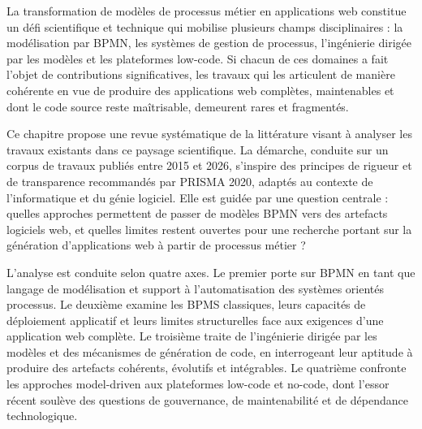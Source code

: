 ﻿
\label{chap:revue-litterature}
\nocite{prisma2020,schaffer2021,sajji2022,sajji2023,pietruck2020,greifenberg2015,rahad2021,dragas2024,delgado2022,avila2021,lopes2023,bucaioni2022,diruscio2022,rokis2023,ajimati2025,castillo2024,sajji2025,krouwel2024,martinez2026,drave2022,fedeli2024,soliman2025,horner2026,kourani2025,kourani2024,licardo2026,neto2022,uyanik2023,hoyos2017,hemel2008,syriani2018,siahaan2024,laaz2020,salado2024,campagna2025,pankowska2024,diaz2018}



La transformation de modèles de processus métier en applications web constitue un défi scientifique et technique qui mobilise plusieurs champs disciplinaires : la modélisation par BPMN, les systèmes de gestion de processus, l'ingénierie dirigée par les modèles et les plateformes low-code. Si chacun de ces domaines a fait l'objet de contributions significatives, les travaux qui les articulent de manière cohérente en vue de produire des applications web complètes, maintenables et dont le code source reste maîtrisable, demeurent rares et fragmentés.

Ce chapitre propose une revue systématique de la littérature visant à analyser les travaux existants dans ce paysage scientifique. La démarche, conduite sur un corpus de travaux publiés entre 2015 et 2026, s'inspire des principes de rigueur et de transparence recommandés par PRISMA 2020, adaptés au contexte de l'informatique et du génie logiciel. Elle est guidée par une question centrale : quelles approches permettent de passer de modèles BPMN vers des artefacts logiciels web, et quelles limites restent ouvertes pour une recherche portant sur la génération d'applications web à partir de processus métier ?

L'analyse est conduite selon quatre axes. Le premier porte sur BPMN en tant que langage de modélisation et support à l'automatisation des systèmes orientés processus. Le deuxième examine les BPMS classiques, leurs capacités de déploiement applicatif et leurs limites structurelles face aux exigences d'une application web complète. Le troisième traite de l'ingénierie dirigée par les modèles et des mécanismes de génération de code, en interrogeant leur aptitude à produire des artefacts cohérents, évolutifs et intégrables. Le quatrième confronte les approches model-driven aux plateformes low-code et no-code, dont l'essor récent soulève des questions de gouvernance, de maintenabilité et de dépendance technologique.

